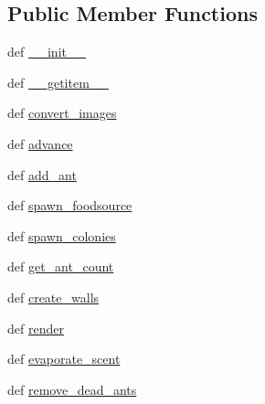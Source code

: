 \subsection*{Public Member Functions}
\begin{DoxyCompactItemize}
\item 
def \hyperlink{classworld_1_1World_a4351253668240be9d3a0d5bc2f1aa18f}{\+\_\+\+\_\+init\+\_\+\+\_\+}
\item 
def \hyperlink{classworld_1_1World_ad12e75d551845a567951b885d204153d}{\+\_\+\+\_\+getitem\+\_\+\+\_\+}
\item 
def \hyperlink{classworld_1_1World_add7ffc7d3af488f4ed006a401b842ca1}{convert\+\_\+images}
\item 
def \hyperlink{classworld_1_1World_a254dbfa03188d38b7e822c1a2e20a568}{advance}
\item 
def \hyperlink{classworld_1_1World_a83af04b7168b479b93ef75b1a9fb8dc2}{add\+\_\+ant}
\item 
def \hyperlink{classworld_1_1World_af83c041eb0a9fee93eae12bb24038b0a}{spawn\+\_\+foodsource}
\item 
def \hyperlink{classworld_1_1World_aa0e6994339219d9e933edc9bcb0c8eb5}{spawn\+\_\+colonies}
\item 
def \hyperlink{classworld_1_1World_a71b1d7a0d1b22365b4d8ed2ac6a72b98}{get\+\_\+ant\+\_\+count}
\item 
def \hyperlink{classworld_1_1World_a85d9fcbadcac5428c6f4207404221826}{create\+\_\+walls}
\item 
def \hyperlink{classworld_1_1World_a40aafbcc96e8592e314cf08068aba5f5}{render}
\item 
def \hyperlink{classworld_1_1World_a45f0825ea2f6b659d376fbc859aa208a}{evaporate\+\_\+scent}
\item 
def \hyperlink{classworld_1_1World_ad2b1f49767a4d6eae2291b1ff48c9b0d}{remove\+\_\+dead\+\_\+ants}
\end{DoxyCompactItemize}

